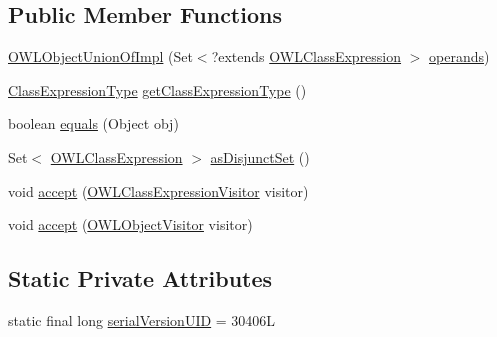 \subsection*{Public Member Functions}
\begin{DoxyCompactItemize}
\item 
\hyperlink{classuk_1_1ac_1_1manchester_1_1cs_1_1owl_1_1owlapi_1_1_o_w_l_object_union_of_impl_ad7972f6c1ec86560ac57a61f9fea3632}{O\-W\-L\-Object\-Union\-Of\-Impl} (Set$<$?extends \hyperlink{interfaceorg_1_1semanticweb_1_1owlapi_1_1model_1_1_o_w_l_class_expression}{O\-W\-L\-Class\-Expression} $>$ \hyperlink{classuk_1_1ac_1_1manchester_1_1cs_1_1owl_1_1owlapi_1_1_o_w_l_nary_boolean_class_expression_impl_af6e58b4bd9107f35125d03637c9dcb0f}{operands})
\item 
\hyperlink{enumorg_1_1semanticweb_1_1owlapi_1_1model_1_1_class_expression_type}{Class\-Expression\-Type} \hyperlink{classuk_1_1ac_1_1manchester_1_1cs_1_1owl_1_1owlapi_1_1_o_w_l_object_union_of_impl_ab2741b4b2ee62f8a3e53d094d64ba57a}{get\-Class\-Expression\-Type} ()
\item 
boolean \hyperlink{classuk_1_1ac_1_1manchester_1_1cs_1_1owl_1_1owlapi_1_1_o_w_l_object_union_of_impl_ae6a6b1f44d5653b0a524bcacdc55591d}{equals} (Object obj)
\item 
Set$<$ \hyperlink{interfaceorg_1_1semanticweb_1_1owlapi_1_1model_1_1_o_w_l_class_expression}{O\-W\-L\-Class\-Expression} $>$ \hyperlink{classuk_1_1ac_1_1manchester_1_1cs_1_1owl_1_1owlapi_1_1_o_w_l_object_union_of_impl_a31768d59b1fdac10432a508d622901f0}{as\-Disjunct\-Set} ()
\item 
void \hyperlink{classuk_1_1ac_1_1manchester_1_1cs_1_1owl_1_1owlapi_1_1_o_w_l_object_union_of_impl_af5c7e1bdca10e6c7fd3f30e3ad44e1c1}{accept} (\hyperlink{interfaceorg_1_1semanticweb_1_1owlapi_1_1model_1_1_o_w_l_class_expression_visitor}{O\-W\-L\-Class\-Expression\-Visitor} visitor)
\item 
void \hyperlink{classuk_1_1ac_1_1manchester_1_1cs_1_1owl_1_1owlapi_1_1_o_w_l_object_union_of_impl_a4eee8dd410c03e94f8aae8b9217b2961}{accept} (\hyperlink{interfaceorg_1_1semanticweb_1_1owlapi_1_1model_1_1_o_w_l_object_visitor}{O\-W\-L\-Object\-Visitor} visitor)
\end{DoxyCompactItemize}
\subsection*{Static Private Attributes}
\begin{DoxyCompactItemize}
\item 
static final long \hyperlink{classuk_1_1ac_1_1manchester_1_1cs_1_1owl_1_1owlapi_1_1_o_w_l_object_union_of_impl_a36814d6c8982faba27d545b24447963d}{serial\-Version\-U\-I\-D} = 30406\-L
\end{DoxyCompactItemize}
